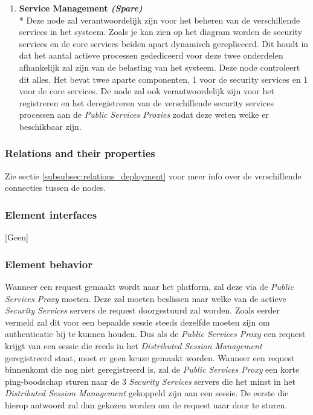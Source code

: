 \documentclass[a4paper,10pt]{article}
\begin{document}
\begin{enumerate}
\item \textbf{Service Management \textit{(Spare)}}\\*
Deze node zal verantwoordelijk zijn voor het beheren van de verschillende services in het systeem. Zoals je kan zien op het diagram worden de security services en de core services beiden apart dynamisch gerepliceerd. Dit houdt in dat het aantal actieve processen gedediceerd voor deze twee onderdelen afhankelijk zal zijn van de belasting van het systeem. Deze node controleert dit alles. Het bevat twee aparte componenten, 1 voor de security services en 1 voor de core services. De node zal ook verantwoordelijk zijn voor het registreren en het deregistreren van de verschillende security services processen aan de \textit{Public Services Proxies} zodat deze weten welke er beschikbaar zijn.

\end{enumerate}


\subsubsection*{Relations and their properties}
Zie sectie \ref{subsubsec:relations_deployment} voor meer info over de verschillende connecties tussen de nodes.

\subsubsection*{Element interfaces}
[Geen]

\subsubsection*{Element behavior}
Wanneer een request gemaakt wordt naar het platform, zal deze via de \textit{Public Services Proxy} moeten. Deze zal moeten beslissen naar welke van de actieve \textit{Security Services} servers de request doorgestuurd zal worden. Zoals eerder vermeld zal dit voor een bepaalde sessie steeds dezelfde moeten zijn om authenticatie bij te kunnen houden. Dus als de \textit{Public Services Proxy} een request krijgt van een sessie die reeds in het \textit{Distributed Session Management} geregistreerd staat, moet er geen keuze gemaakt worden. Wanneer een request binnenkomt die nog niet geregistreerd is, zal de \textit{Public Services Proxy} een korte ping-boodschap sturen naar de 3 \textit{Security Services} servers die het minst in het \textit{Distributed Session Management} gekoppeld zijn aan een sessie. De eerste die hierop antwoord zal dan gekozen worden om de request naar door te sturen.
\end{document}
